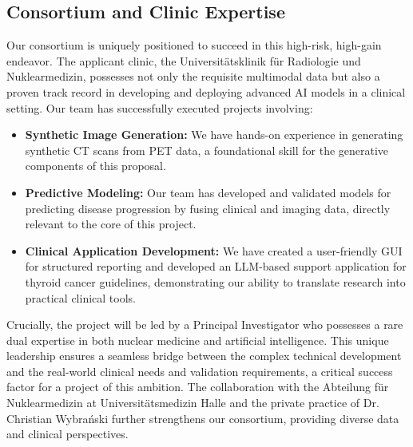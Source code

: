 \documentclass[11pt, a4paper]{article}
\begin{document}
\subsection{Consortium and Clinic Expertise}
Our consortium is uniquely positioned to succeed in this high-risk, high-gain endeavor. The applicant clinic, the Universitätsklinik für Radiologie und Nuklearmedizin, possesses not only the requisite multimodal data but also a proven track record in developing and deploying advanced AI models in a clinical setting. Our team has successfully executed projects involving:
\begin{itemize}
    \item \textbf{Synthetic Image Generation:} We have hands-on experience in generating synthetic CT scans from PET data, a foundational skill for the generative components of this proposal.
    \item \textbf{Predictive Modeling:} Our team has developed and validated models for predicting disease progression by fusing clinical and imaging data, directly relevant to the core of this project.
    \item \textbf{Clinical Application Development:} We have created a user-friendly GUI for structured reporting and developed an LLM-based support application for thyroid cancer guidelines, demonstrating our ability to translate research into practical clinical tools.
\end{itemize}
Crucially, the project will be led by a Principal Investigator who possesses a rare dual expertise in both nuclear medicine and artificial intelligence. This unique leadership ensures a seamless bridge between the complex technical development and the real-world clinical needs and validation requirements, a critical success factor for a project of this ambition. The collaboration with the Abteilung für Nuklearmedizin at Universitätsmedizin Halle and the private practice of Dr. Christian Wybrański further strengthens our consortium, providing diverse data and clinical perspectives.
\end{document}
